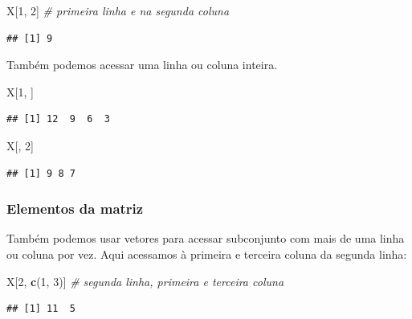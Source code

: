 \documentclass[
]{book}
\newenvironment{Shaded}{\begin{snugshade}}{\end{snugshade}}
\newcommand{\CommentTok}[1]{\textcolor[rgb]{0.56,0.35,0.01}{\textit{#1}}}
\newcommand{\DecValTok}[1]{\textcolor[rgb]{0.00,0.00,0.81}{#1}}
\newcommand{\KeywordTok}[1]{\textcolor[rgb]{0.13,0.29,0.53}{\textbf{#1}}}
\newcommand{\NormalTok}[1]{#1}
\theoremstyle{definition}
\theoremstyle{definition}
\theoremstyle{definition}
\theoremstyle{remark}
\begin{document}
\begin{Shaded}
\begin{Highlighting}[]
\NormalTok{X[}\DecValTok{1}\NormalTok{, }\DecValTok{2}\NormalTok{] }\CommentTok{# primeira linha e na segunda coluna}
\end{Highlighting}
\end{Shaded}

\begin{verbatim}
## [1] 9
\end{verbatim}

Também podemos acessar uma linha ou coluna inteira.

\begin{Shaded}
\begin{Highlighting}[]
\NormalTok{X[}\DecValTok{1}\NormalTok{, ]}
\end{Highlighting}
\end{Shaded}

\begin{verbatim}
## [1] 12  9  6  3
\end{verbatim}

\begin{Shaded}
\begin{Highlighting}[]
\NormalTok{X[, }\DecValTok{2}\NormalTok{]}
\end{Highlighting}
\end{Shaded}

\begin{verbatim}
## [1] 9 8 7
\end{verbatim}

\hypertarget{elementos-da-matriz}{%
\subsubsection{Elementos da matriz}\label{elementos-da-matriz}}

Também podemos usar vetores para acessar subconjunto com mais de uma linha ou coluna por vez. Aqui acessamos à primeira e terceira coluna da segunda linha:

\begin{Shaded}
\begin{Highlighting}[]
\NormalTok{X[}\DecValTok{2}\NormalTok{, }\KeywordTok{c}\NormalTok{(}\DecValTok{1}\NormalTok{, }\DecValTok{3}\NormalTok{)] }\CommentTok{# segunda linha, primeira e terceira coluna}
\end{Highlighting}
\end{Shaded}

\begin{verbatim}
## [1] 11  5
\end{verbatim}
\end{document}
